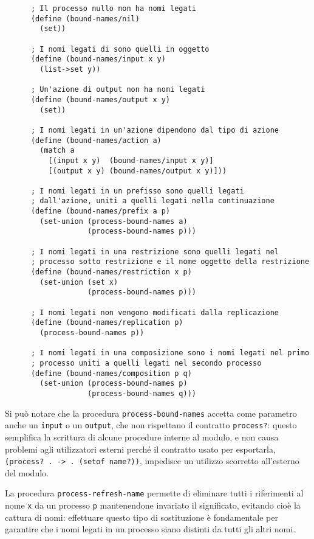 \begin{lstlisting}
      ; Il processo nullo non ha nomi legati
      (define (bound-names/nil)
        (set))

      ; I nomi legati di sono quelli in oggetto
      (define (bound-names/input x y)
        (list->set y))

      ; Un'azione di output non ha nomi legati
      (define (bound-names/output x y)
        (set))

      ; I nomi legati in un'azione dipendono dal tipo di azione
      (define (bound-names/action a)
        (match a
          [(input x y)  (bound-names/input x y)]
          [(output x y) (bound-names/output x y)]))

      ; I nomi legati in un prefisso sono quelli legati
      ; dall'azione, uniti a quelli legati nella continuazione
      (define (bound-names/prefix a p)
        (set-union (process-bound-names a)
                   (process-bound-names p)))

      ; I nomi legati in una restrizione sono quelli legati nel
      ; processo sotto restrizione e il nome oggetto della restrizione
      (define (bound-names/restriction x p)
        (set-union (set x)
                   (process-bound-names p)))

      ; I nomi legati non vengono modificati dalla replicazione
      (define (bound-names/replication p)
        (process-bound-names p))

      ; I nomi legati in una composizione sono i nomi legati nel primo
      ; processo uniti a quelli legati nel secondo processo
      (define (bound-names/composition p q)
        (set-union (process-bound-names p)
                   (process-bound-names q)))
\end{lstlisting}

Si pu\`o notare che la procedura \lstinline{process-bound-names} accetta
come parametro anche un \lstinline{input} o un \lstinline{output}, che
non rispettano il contratto \lstinline{process?}: questo semplifica la
scrittura di alcune procedure interne al modulo, e non causa problemi
agli utilizzatori esterni perch\'e il contratto usato per esportarla,
\lstinline{(process? . -> . (setof name?))}, impedisce un utilizzo scorretto
all'esterno del modulo.

La procedura \lstinline{process-refresh-name} permette di eliminare tutti
i riferimenti al nome \lstinline{x} da un processo \lstinline{p}
mantenendone invariato il significato, evitando cio\`e la cattura di nomi:
effettuare questo tipo di sostituzione \`e fondamentale per garantire che
i nomi legati in un processo siano distinti da tutti gli altri nomi.

